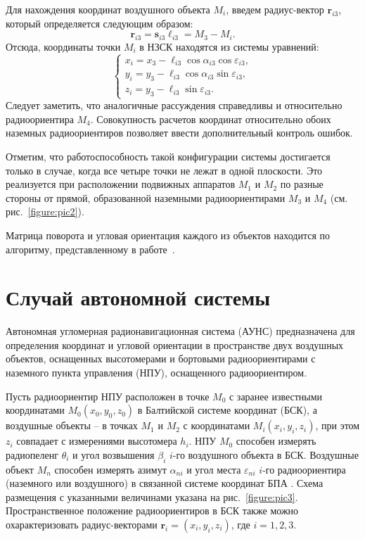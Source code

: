 \documentclass[a4paper,12pt]{article}
\begin{document}
Для нахождения координат воздушного объекта $M_i$, введем радиус-вектор $\mathbf{r}_{i3}$, который определяется следующим
образом:
\begin{equation}
    \mathbf{r}_{i3} = \mathbf{s}_{i3} \ell_{i3} = M_3 - M_i.
\end{equation}
Отсюда, координаты точки $M_i$ в НЗСК находятся из системы уравнений:
\begin{equation}
    \begin{cases}
        x_i = x_3 - \ell_{i3} \cos\alpha_{i3} \cos\varepsilon_{i3}, \\
        y_i = y_3 - \ell_{i3} \cos\alpha_{i3} \sin\varepsilon_{i3}, \\
        z_i = y_3 - \ell_{i3} \sin\varepsilon_{i3}.
    \end{cases}
\end{equation}
Следует заметить, что аналогичные рассуждения справедливы и относительно радиоориентира $M_4$. Совокупность
расчетов координат относительно обоих наземных радиоориентиров позволяет ввести дополнительный контроль ошибок.

Отметим, что работоспособность такой конфигурации системы достигается только в случае, когда все четыре точки не
лежат в одной плоскости. Это реализуется при расположении подвижных аппаратов $M_1$ и $M_2$ по разные стороны от прямой,
образованной наземными радиоориентирами $M_3$ и $M_4$ (см. рис.~\ref{figure:pic2}).

Матрица поворота и угловая ориентация каждого из объектов находится по алгоритму, представленному в работе~\cite{antennas}.

\section{Случай автономной системы}
Автономная угломерная радионавигационная система (АУНС) предназначена для определения
координат и угловой ориентации в пространстве двух воздушных объектов, оснащенных
высотомерами и бортовыми радиоориентирами с наземного пункта управления (НПУ),
оснащенного радиоориентиром.

Пусть радиоориентир НПУ расположен в точке $M_0$ с заранее известными координатами
$M_0\left(x_0, y_0, z_0\right)$ в Балтийской системе координат (БСК), а воздушные объекты
-- в точках $M_1$ и $M_2$ с координатами $M_i\left(x_i, y_i, z_i\right)$, при этом $z_i$
совпадает с измерениями высотомера $h_i$. НПУ $M_0$ способен измерять радиопеленг $\theta_i$
и угол возвышения $\beta_i$ $i$-го воздушного объекта в БСК. Воздушные объект $M_n$
способен измерять азимут $\alpha_{ni}$ и угол места $\varepsilon_{ni}$ $i$-го
радиоориентира (наземного или воздушного) в связанной системе координат БПА \cite{antennas}.
Схема размещения с указанными величинами указана на рис.~\ref{figure:pic3}.
Пространственное положение радиоориентиров в БСК также можно охарактеризовать радиус-векторами
$\mathbf{r}_i = \left(x_i, y_i, z_i\right)$, где $i = 1,2,3$.
\end{document}
